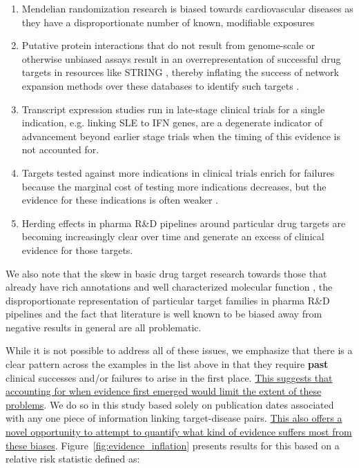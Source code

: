 \documentclass{article}
\begin{document}
\begin{enumerate}[topsep=0pt,itemsep=-1ex,partopsep=1ex,parsep=1ex]
\item Mendelian randomization research is biased towards cardiovascular diseases as they have a disproportionate number of known, modifiable exposures \cite{PMID:36736292}
\item Putative protein interactions that do not result from genome-scale or otherwise unbiased assays result in an overrepresentation of successful drug targets in resources like STRING \cite{PMID:36370105}, thereby inflating the success of network expansion methods over these databases to identify such targets \cite{Sadler2023-xd}.
\item Transcript expression studies run in late-stage clinical trials for a single indication, e.g. \cite{PMID:27723281} linking SLE to IFN genes, are a degenerate indicator of advancement beyond earlier stage trials when the timing of this evidence is not accounted for.
\item Targets tested against more indications in clinical trials enrich for failures because the marginal cost of testing more indications decreases, but the evidence for these indications is often weaker \cite{PMID:33262371}.
\item Herding effects in pharma R\&D pipelines around particular drug targets are becoming increasingly clear over time \cite{PMID:37117303} and generate an excess of clinical evidence for those targets.
\end{enumerate}

We also note that the skew in basic drug target research towards those that already have rich annotations and well characterized molecular function \cite{PMID:29358745}, the disproportionate representation of particular target families in pharma R\&D pipelines \cite{PMID:27910877,PPR:PPR7029} and the fact that literature is well known to be biased away from negative results in general \cite{PMID:32893970} are all problematic. 

While it is not possible to address all of these issues, we emphasize that there is a clear pattern across the examples in the list above in that they require \textbf{past} clinical successes and/or failures to arise in the first place. \ul{This suggests that accounting for when evidence first emerged would limit the extent of these problems}. We do so in this study based solely on publication dates associated with any one piece of information linking target-disease pairs. \ul{This also offers a novel opportunity to attempt to quantify what kind of evidence suffers most from these biases}. Figure~\ref{fig:evidence_inflation} presents results for this based on a relative risk statistic defined as:
\end{document}
